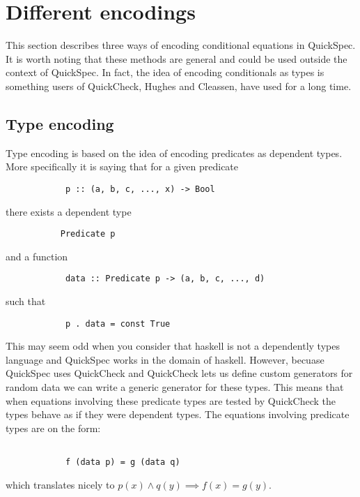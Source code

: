 \section{Different encodings}

    This section describes three
    ways of encoding conditional
    equations in QuickSpec. It is
    worth noting that these methods
    are general and could be used outside
    the context of QuickSpec. In fact,
    the idea of encoding conditionals
    as types is something users of
    QuickCheck, Hughes and Cleassen, %
    have used for a long time.

    \subsection{Type encoding}

        Type encoding is based on the idea of encoding
        predicates as dependent types. More specifically
        it is saying that for a given predicate
        \begin{verbatim}
            p :: (a, b, c, ..., x) -> Bool
        \end{verbatim}
        there exists a dependent type
        \begin{verbatim}
           Predicate p
        \end{verbatim}
        and a function 
        \begin{verbatim}
            data :: Predicate p -> (a, b, c, ..., d)
        \end{verbatim}
        such that 
        \begin{verbatim}
            p . data = const True
        \end{verbatim}
        This may seem odd when you consider that haskell is not a dependently types
        language and QuickSpec works in the domain of haskell.
        However, becuase QuickSpec uses QuickCheck and QuickCheck lets us define
        custom generators for random data we can write a generic generator for
        these types. This means that when equations involving these predicate
        types are tested by QuickCheck the types behave as if they were dependent types.
        The equations involving predicate types are on the form:
        \begin{verbatim}
            
            f (data p) = g (data q)

        \end{verbatim}
        which translates nicely to $p(x) \wedge q(y) \implies f(x) = g(y)$.
